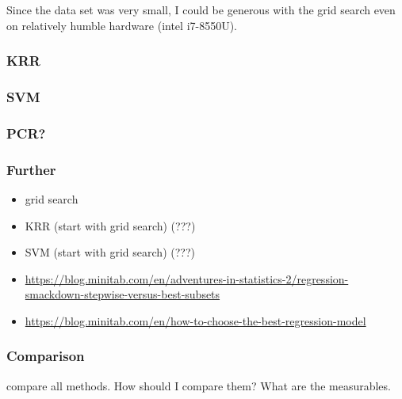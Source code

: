 Since the data set was very small, I could be generous with the grid search even on relatively humble hardware (intel i7-8550U). 

\subsubsection{KRR}

\subsubsection{SVM}

\subsubsection{PCR?}


\subsubsection{Further}
\begin{itemize}
    \item grid search
    \item KRR (start with grid search) (???)
    \item SVM (start with grid search) (???)
    \item \url{https://blog.minitab.com/en/adventures-in-statistics-2/regression-smackdown-stepwise-versus-best-subsets}
    \item \url{https://blog.minitab.com/en/how-to-choose-the-best-regression-model}
\end{itemize}

\subsubsection{Comparison} 
compare all methods. 
How should I compare them? 
What are the measurables. 

